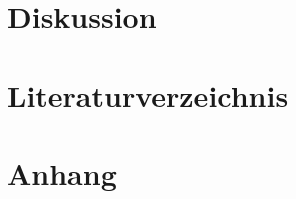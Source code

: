 \documentclass[12pt]{article}
\begin{document}
\section{Diskussion}\label{sec:diskussion}

\section{Literaturverzeichnis}\label{sec:literaturverzeichnis}
\printbibliography[heading = none]
\newpage

\section{Anhang}\label{sec:anhang}
\end{document}
